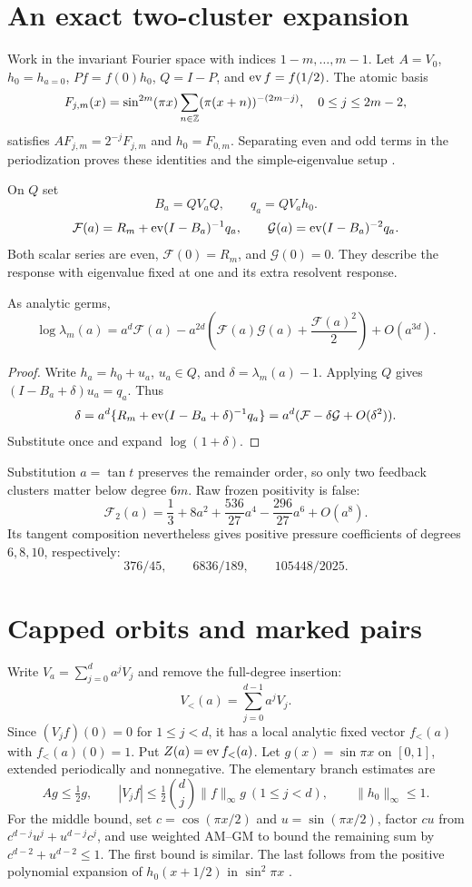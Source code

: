 \documentclass[11pt,a4paper]{article}
\theoremstyle{remark}\newtheorem*{ednote}{Editorial note (ProveIt, 2026-10-01)}
\begin{document}
\section{An exact two-cluster expansion}
Work in the invariant Fourier space with indices $1-m,\ldots,m-1$. Let $A=V_0$, $h_0=h_{a=0}$, $Pf=f(0)h_0$, $Q=I-P$, and $\operatorname{ev} f=f(1/2)$. The atomic basis
\[
F_{j,m}(x)=\sin^{2m}(\pi x)\sum_{n\in\mathbb Z}(\pi(x+n))^{-(2m-j)},\quad0\le j\le2m-2,
\]
satisfies $AF_{j,m}=2^{-j}F_{j,m}$ and $h_0=F_{0,m}$. Separating even and odd terms in the periodization proves these identities and the simple-eigenvalue setup \cite{integer,triangle}.

On $Q$ set
\[
B_a=QV_aQ,\qquad q_a=QV_ah_0.
\]
\[
\mathcal F(a)=R_m+\operatorname{ev}(I-B_a)^{-1}q_a,\qquad
\mathcal G(a)=\operatorname{ev}(I-B_a)^{-2}q_a.
\]
Both scalar series are even, $\mathcal F(0)=R_m$, and $\mathcal G(0)=0$. They describe the response with eigenvalue fixed at one and its extra resolvent response.
\begin{lemma}\label{lem:schur}
As analytic germs,
\begin{equation}\label{eq:schur}
\log\lambda_m(a)=a^d\mathcal F(a)
-a^{2d}\left(\mathcal F(a)\mathcal G(a)+\frac{\mathcal F(a)^2}{2}\right)+O(a^{3d}).
\end{equation}
\end{lemma}
\begin{proof}
Write $h_a=h_0+u_a$, $u_a\in Q$, and $\delta=\lambda_m(a)-1$. Applying $Q$ gives $(I-B_a+\delta)u_a=q_a$. Thus
\[
\delta=a^d\{R_m+\operatorname{ev}(I-B_a+\delta)^{-1}q_a\}
=a^d(\mathcal F-\delta\mathcal G+O(\delta^2)).
\]
Substitute once and expand $\log(1+\delta)$.
\end{proof}
Substitution $a=\tan t$ preserves the remainder order, so only two feedback clusters matter below degree $6m$. Raw frozen positivity is false:
\[
\mathcal F_2(a)=\frac13+8a^2+\frac{536}{27}a^4-\frac{296}{27}a^6+O(a^8).
\]
Its tangent composition nevertheless gives positive pressure coefficients of degrees $6,8,10$, respectively:
\[
376/45,\qquad6836/189,\qquad105448/2025.
\]

\section{Capped orbits and marked pairs}
Write $V_a=\sum_{j=0}^d a^jV_j$ and remove the full-degree insertion:
\[
V_{<}(a)=\sum_{j=0}^{d-1}a^jV_j.
\]
Since $(V_jf)(0)=0$ for $1\le j<d$, it has a local analytic fixed vector $f_{<}(a)$ with $f_{<}(a)(0)=1$. Put $Z(a)=\operatorname{ev} f_{<}(a)$. Let $g(x)=\sin\pi x$ on $[0,1]$, extended periodically and nonnegative. The elementary branch estimates are
\begin{equation}\label{eq:contractions}
Ag\le\tfrac12g,\qquad
|V_jf|\le\tfrac12\binom dj\|f\|_\infty g\ (1\le j<d),\qquad \|h_0\|_\infty\le1.
\end{equation}
For the middle bound, set $c=\cos(\pi x/2)$ and $u=\sin(\pi x/2)$, factor $cu$ from $c^{d-j}u^j+u^{d-j}c^j$, and use weighted AM--GM to bound the remaining sum by $c^{d-2}+u^{d-2}\le1$. The first bound is similar. The last follows from the positive polynomial expansion of $h_0(x+1/2)$ in $\sin^2\pi x$ \cite{boundary}.
\end{document}
